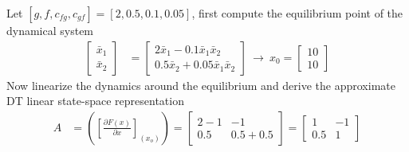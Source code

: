 \documentclass[twoside]{article}
\begin{document}
Let $[g , f , c_{fg} , c_{gf}] = [2 , 0.5 , 0.1 , 0.05]$, first compute the
equilibrium point of the dynamical system
%
\begin{align*}
	\left[ \begin{array}{c} \bar{x}_{1} \\ \bar{x}_{2} \end{array} \right]  &=
\left[ \begin{array}{c} 2 \bar{x}_1 - 0.1 \bar{x}_1 \bar{x}_2   \\ 
 0.5 \bar{x}_2 + 0.05 \bar{x}_1 \bar{x}_2  \end{array} \right] \
  \rightarrow \ x_0 = \left[ \begin{array}{c} 10 \\ 10 \end{array} \right] 
\end{align*}
%
Now linearize the dynamics around the equilibrium and derive the
approximate DT linear state-space representation
%
\begin{align*}
A &= \left( \left[ \frac{\partial F(x)}{\partial x}
                      \right]_{(x_o)} \right) =
    \left[ \begin{array}{cc} 2 - 1 & 
             - 1 \\ 
                          0.5 
           & 
             0.5 + 0.5
\end{array} \right]  =
                    \left[ \begin{array}{cc} 1 & -1 \\ 0.5 & 1 \end{array}  \right]
\end{align*}

\newpage
\end{document}
